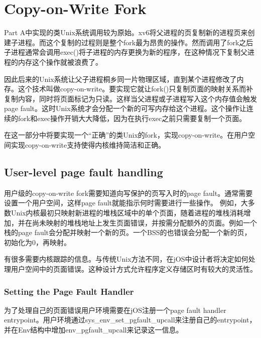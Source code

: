 \section{Copy-on-Write Fork}
\par Part A中实现的类Unix系统调用较为原始。xv6将父进程的页复制新的进程页来创建子进程。而这个复制的过程则是整个fork最为昂贵的操作。然而调用了fork之后子进程通常会调用exec()将子进程的内存更换为新的程序，在这种情况下复制父进程的内存这个操作就被浪费了。
\par 因此后来的Unix系统让父子进程桐乡同一片物理区域，直到某个进程修改了内存。这个技术叫做copy-on-write。要实现它就让fork()只复制页面的映射关系而补复制内容，同时将页面标记为只读。这样当父进程或子进程写入这个内存值会触发page fault。这时Unix系统才会分配一个新的可写内存给这个进程。这个操作让连续的fork和exec操作开销大大降低，因为在执行exec之前只需要复制一个页面。
\par 在这一部分中将要实现一个``正确''的类Unix的fork，实现copy-on-write。在用户空间实现copy-on-write支持使得内核维持简洁和正确。

\subsection{User-level page fault handling}
\par 用户级的copy-on-write fork需要知道向写保护的页写入时的page fault。通常需要设置一个用户空间，这样page fault就能指示何时需要进行一些操作。 例如，大多数Unix内核最初只映射新进程的堆栈区域中的单个页面，随着进程的堆栈消耗增加，并在尚未映射的堆栈地址上发生页面错误，并按需分配额外的页面。例如一个栈的page fault会分配并映射一个新的页。一个BSS的也错误会分配一个新的页，初始化为0，再映射。
\par 有很多需要内核跟踪的信息。与传统Unix方法不同，在jOS中设计者将决定如何处理用户空间中的页面错误。这种设计方式允许程序定义存储区时有较大的灵活性。

\subsubsection{Setting the Page Fault Handler}
\par 为了处理自己的页面错误用户环境需要在jOS注册一个page fault handler entrypoint。用户环境通过sys\_env\_set\_pgfault\_upcall来注册自己的entrypoint，并在Env结构中增加env\_pgfault\_upcall来记录这一信息。

